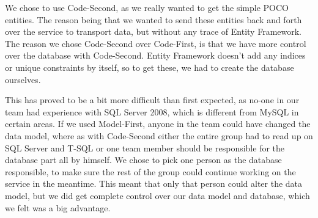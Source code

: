 We chose to use Code-Second, as we really wanted to get the simple POCO entities. The reason being that we wanted to send these entities back and forth over the service to transport data, but without any trace of Entity Framework. The reason we chose Code-Second over Code-First, is that we have more control over the database with Code-Second. Entity Framework doesn't add any indices or unique constraints by itself, so to get these, we had to create the database ourselves.

This has proved to be a bit more difficult than first expected, as no-one in our team had experience with SQL Server 2008, which is different from MySQL in certain areas. If we used Model-First, anyone in the team could have changed the data model, where as with Code-Second either the entire group had to read up on SQL Server and T-SQL or one team member should be responsible for the database part all by himself. We chose to pick one person as the database responsible, to make sure the rest of the group could continue working on the service in the meantime. This meant that only that person could alter the data model, but we did get complete control over our data model and database, which we felt was a big advantage.